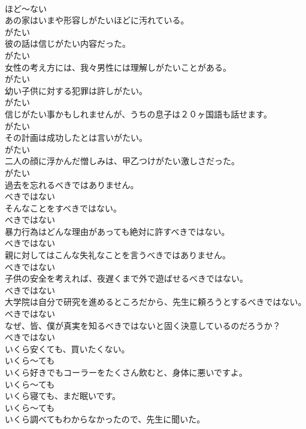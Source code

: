 \documentclass[8pt]{extreport}
\begin{document}
\begin{CJK}{UTF8}{min}
\\	ほど～ない
\\	あの家はいまや形容しがたいほどに汚れている。	
\\	がたい
\\	彼の話は信じがたい内容だった。	
\\	がたい
\\	女性の考え方には、我々男性には理解しがたいことがある。	
\\	がたい
\\	幼い子供に対する犯罪は許しがたい。	
\\	がたい
\\	信じがたい事かもしれませんが、うちの息子は２０ヶ国語も話せます。	
\\	がたい
\\	その計画は成功したとは言いがたい。	
\\	がたい
\\	二人の顔に浮かんだ憎しみは、甲乙つけがたい激しさだった。	
\\	がたい
\\	過去を忘れるべきではありません。	
\\	べきではない
\\	そんなことをすべきではない。	
\\	べきではない
\\	暴力行為はどんな理由があっても絶対に許すべきではない。	
\\	べきではない
\\	親に対してはこんな失礼なことを言うべきではありません。	
\\	べきではない
\\	子供の安全を考えれば、夜遅くまで外で遊ばせるべきではない。	
\\	べきではない
\\	大学院は自分で研究を進めるところだから、先生に頼ろうとするべきではない。	
\\	べきではない
\\	なぜ、皆、僕が真実を知るべきではないと固く決意しているのだろうか？	
\\	べきではない
\\	いくら安くても、買いたくない。	
\\	いくら～ても
\\	いくら好きでもコーラーをたくさん飲むと、身体に悪いですよ。	
\\	いくら～ても
\\	いくら寝ても、まだ眠いです。	
\\	いくら～ても
\\	いくら調べてもわからなかったので、先生に聞いた。	

\end{CJK}
\end{document}
